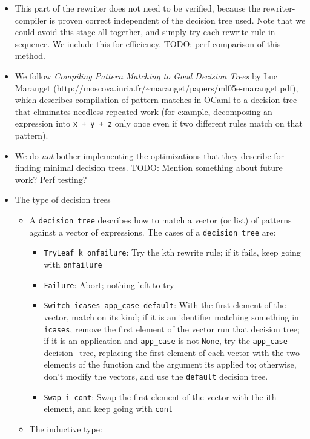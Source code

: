 \begin{itemize}
\tightlist
\item
  This part of the rewriter does not need to be verified, because the
  rewriter-compiler is proven correct independent of the decision tree
  used. Note that we could avoid this stage all together, and simply try
  each rewrite rule in sequence. We include this for efficiency. TODO:
  perf comparison of this method.
\item
  We follow \emph{Compiling Pattern Matching to Good Decision Trees} by
  Luc Maranget
  (http://moscova.inria.fr/\textasciitilde maranget/papers/ml05e-maranget.pdf),
  which describes compilation of pattern matches in OCaml to a decision
  tree that eliminates needless repeated work (for example, decomposing
  an expression into \texttt{x\ +\ y\ +\ z} only once even if two
  different rules match on that pattern).
\item
  We do \emph{not} bother implementing the optimizations that they
  describe for finding minimal decision trees. TODO: Mention something
  about future work? Perf testing?
\item
  The type of decision trees

  \begin{itemize}
  \item
    A \texttt{decision\_tree} describes how to match a vector (or list)
    of patterns against a vector of expressions. The cases of a
    \texttt{decision\_tree} are:

    \begin{itemize}
    \tightlist
    \item
      \texttt{TryLeaf\ k\ onfailure}: Try the kth rewrite rule; if it
      fails, keep going with \texttt{onfailure}
    \item
      \texttt{Failure}: Abort; nothing left to try
    \item
      \texttt{Switch\ icases\ app\_case\ default}: With the first
      element of the vector, match on its kind; if it is an identifier
      matching something in \texttt{icases}, remove the first element of
      the vector run that decision tree; if it is an application and
      \texttt{app\_case} is not \texttt{None}, try the
      \texttt{app\_case} decision\_tree, replacing the first element of
      each vector with the two elements of the function and the argument
      its applied to; otherwise, don't modify the vectors, and use the
      \texttt{default} decision tree.
    \item
      \texttt{Swap\ i\ cont}: Swap the first element of the vector with
      the ith element, and keep going with \texttt{cont}
    \end{itemize}
  \item
    The inductive type:


\end{itemize}
\end{itemize}
